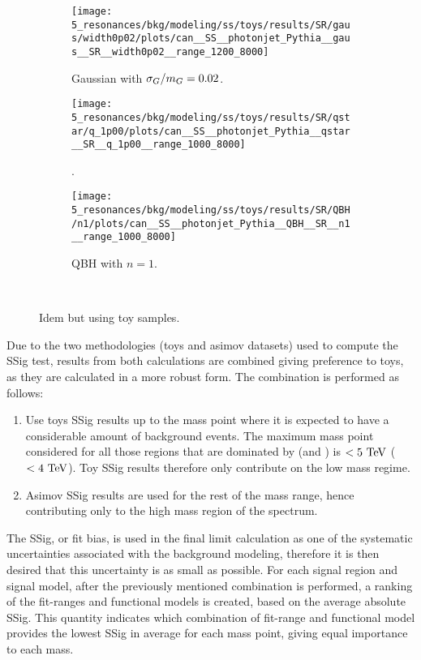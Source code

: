 \begin{figure}[ht!]
    \centering
    \begin{subfigure}[h]{0.32\linewidth}
        \centering
        \texttt{[image: 5\_resonances/bkg/modeling/ss/toys/results/SR/gaus/width0p02/plots/can\_\_SS\_\_photonjet\_Pythia\_\_gaus\_\_SR\_\_width0p02\_\_range\_1200\_8000]}
        \caption{Gaussian with \(\sigma_G / m_{G} = 0.02\).}
    \end{subfigure}
    \hfill
    \begin{subfigure}[h]{0.32\linewidth}
        \centering
        \texttt{[image: 5\_resonances/bkg/modeling/ss/toys/results/SR/qstar/q\_1p00/plots/can\_\_SS\_\_photonjet\_Pythia\_\_qstar\_\_SR\_\_q\_1p00\_\_range\_1000\_8000]}
        \caption{\qstar.}
    \end{subfigure}
    \begin{subfigure}[h]{0.32\linewidth}
        \centering
        \texttt{[image: 5\_resonances/bkg/modeling/ss/toys/results/SR/QBH/n1/plots/can\_\_SS\_\_photonjet\_Pythia\_\_QBH\_\_SR\_\_n1\_\_range\_1000\_8000]}
        \caption{\ac{QBH} with \(n=1\).}
    \end{subfigure}\\
    \caption{Idem \Fig{\ref{fig:bkg_modeling:sstest_results_asimov_SR}} but using toy samples.}
    \label{fig:bkg_modeling:sstest_results_toys_SR}
\end{figure}


Due to the two methodologies (toys and asimov datasets) used to compute the \ac{SSig} test, results from both calculations are combined giving preference to toys, as they are calculated in a more robust form. The combination is performed as follows:
\begin{enumerate}
    \item Use toys \ac{SSig} results up to the mass point where it is expected to have a considerable amount of background events. The maximum mass point considered for all those regions that are dominated by \ljets (\bjets and \cjets) is \(<5~\text{TeV}\) (\(<4~\text{TeV}\)). Toy \ac{SSig} results therefore only contribute on the low mass regime.
    \item Asimov \ac{SSig} results are used for the rest of the mass range, hence contributing only to the high mass region of the spectrum.
\end{enumerate}
The \ac{SSig}, or fit bias, is used in the final limit calculation as one of the systematic uncertainties associated with the background modeling, therefore it is then desired that this uncertainty is as small as possible. For each signal region and signal model, after the previously mentioned combination is performed, a ranking of the fit-ranges and functional models is created, based on the average absolute \ac{SSig}. This quantity indicates which combination of fit-range and functional model provides the lowest \ac{SSig} in average for each mass point, giving equal importance to each mass.


